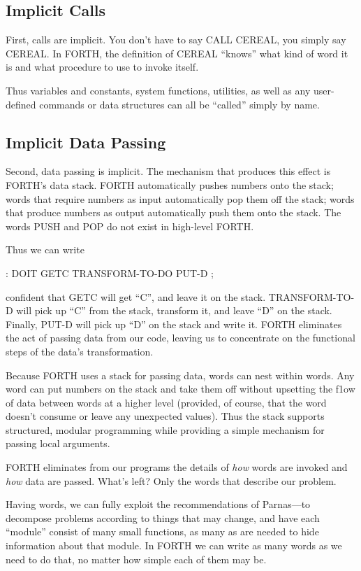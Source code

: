 \subsection{Implicit Calls}
First, calls are implicit. You don't have to say CALL CEREAL, you
simply say CEREAL. In FORTH, the definition of CEREAL {}``knows''
what kind of word it is and what procedure to use to invoke itself.

Thus variables and constants, system functions, utilities, as well
as any user-defined commands or data structures can all be {}``called''
simply by name.


\subsection{Implicit Data Passing}
Second, data passing is implicit. The mechanism that produces this
effect is FORTH's data stack. FORTH automatically pushes numbers onto
the stack; words that require numbers as input automatically pop them
off the stack; words that produce numbers as output automatically
push them onto the stack. The words PUSH and POP do not exist in high-level
FORTH.

Thus we can write

\begin{Code}
: DOIT
    GETC  TRANSFORM-TO-DO  PUT-D ;
\end{Code}
confident that GETC will get {}``C'', and leave it on the stack.
TRANSFORM-TO-D will pick up {}``C'' from the stack, transform it,
and leave {}``D'' on the stack. Finally, PUT-D will pick up {}``D''
on the stack and write it. FORTH eliminates the act of passing data
from our code, leaving us to concentrate on the functional steps of
the data's transformation.

Because FORTH uses a stack for passing data, words can nest within
words. Any word can put numbers on the stack and take them off without
upsetting the f1ow of data between words at a higher level (provided,
of course, that the word doesn't consume or leave any unexpected values).
Thus the stack supports structured, modular programming while providing
a simple mechanism for passing local arguments.

FORTH eliminates from our programs the details of \emph{how} words
are invoked and \emph{how} data are passed. What's left? Only the
words that describe our problem.

Having words, we can fully exploit the recommendations of Parnas---to
decompose problems according to things that may change, and have each
{}``module'' consist of many small functions, as many as are needed
to hide information about that module. In FORTH we can write as many
words as we need to do that, no matter how simple each of them may
be.

